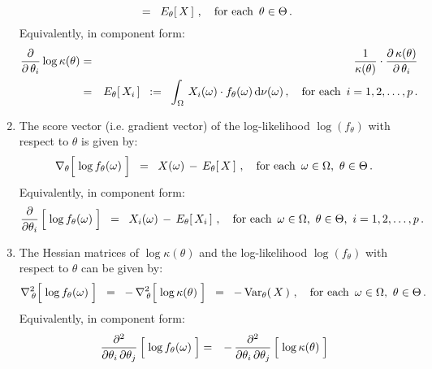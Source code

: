 \begin{theorem}
\begin{enumerate}
\begin{equation*}
	\;\; = \;\;
		E_{\theta}\!\left[\,X\,\right]\,,
	\quad
	\textnormal{for each \,$\theta\in\Theta$}\,.
	\end{equation*}
	Equivalently, in component form:
	\begin{eqnarray*}
	\dfrac{\partial}{\partial\,\theta_{i}} \log \kappa(\theta)
	& = &
		\dfrac{1}{\kappa(\theta)} \cdot \dfrac{\partial\,\kappa(\theta)}{\partial\,\theta_{i}}
	\\
	& = &
		E_{\theta}\!\left[\,X_{i}\,\right]
	\;\; := \;\;
		\int_{\Omega}\, X_{i}(\omega) \cdot f_{\theta}(\omega)\,\textnormal{d}\nu(\omega)\,,
	\quad
	\textnormal{for each \,$i = 1,2,\ldots,p$}\,.
	\end{eqnarray*}
\item\label{formulaScoreVector}
	The score vector (i.e. gradient vector) of the log-likelihood $\log(f_{\theta})$ with respect to $\theta$ is given by:
	\begin{equation*}
	\nabla_{\theta}\!\left[\;\overset{{\color{white}.}}{\log}\,f_{\theta}(\omega)\;\right]
	\;\; = \;\;
		X(\omega) \, - \, E_{\theta}\!\left[\,X\,\right]\,,
	\quad
	\textnormal{for each \,$\omega\in\Omega$, \,$\theta\in\Theta$}\,.
	\end{equation*}	
	Equivalently, in component form:
	\begin{equation*}
	\dfrac{\partial}{\partial \theta_{i}}\left[\;\overset{{\color{white}.}}{\log}\,f_{\theta}(\omega)\;\right]
	\;\; = \;\;
		X_{i}(\omega) \, - \, E_{\theta}\!\left[\,X_{i}\,\right]\,,
	\quad
	\textnormal{for each \,$\omega\in\Omega$, \,$\theta\in\Theta$, \,$i = 1,2,\ldots,p$}\,.
	\end{equation*}	
\item\label{formulaHessianMatrix}
	The Hessian matrices of $\log\kappa(\theta)$ and the log-likelihood $\log(f_{\theta})$
	with respect to $\theta$ can be given by:
	\begin{equation*}
	\Hess_{\,\theta}\!\left[\;\overset{{\color{white}.}}{\log}\,f_{\theta}(\omega)\;\right]
	\;\; = \;\;
		-\,\Hess_{\,\theta}\!\left[\;\overset{{\color{white}.}}{\log}\,\kappa(\theta)\;\right]
	\;\; = \;\;
		-\,\Var_{\theta}\!\left(\,X\,\right)\,,
	\quad
	\textnormal{for each \,$\omega\in\Omega$, \,$\theta\in\Theta$}\,.
	\end{equation*}	
	Equivalently, in component form:
	\begin{eqnarray*}
	\dfrac{\partial^{2}}{\partial \theta_{i}\,\partial\theta_{j}}\left[\;\overset{{\color{white}.}}{\log}\,f_{\theta}(\omega)\;\right]
	& = &
		-\,\dfrac{\partial^{2}}{\partial \theta_{i}\,\partial\theta_{j}}\left[\;\overset{{\color{white}.}}{\log}\,\kappa(\theta)\;\right]

\end{eqnarray*}
\end{enumerate}
\end{theorem}

